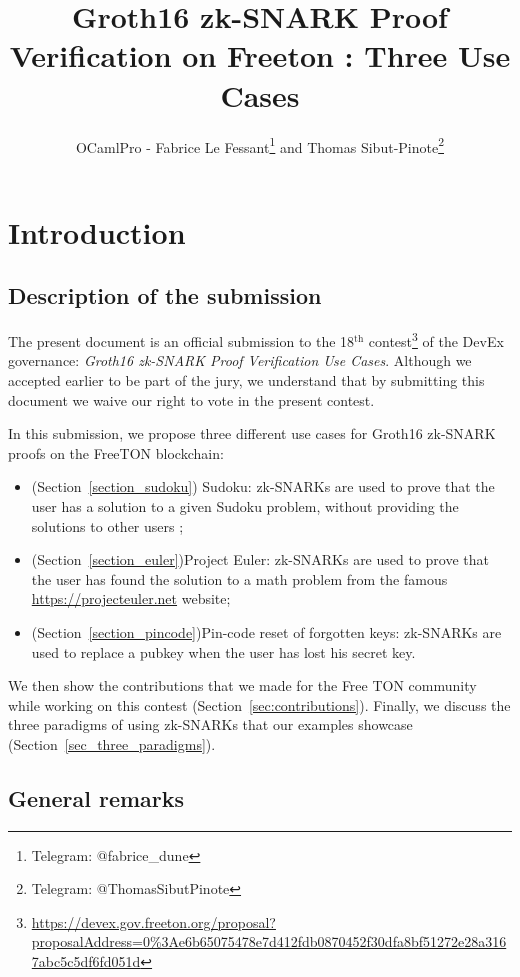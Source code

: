 \documentclass[10pt,a4paper]{article}
\author{OCamlPro - Fabrice Le Fessant\footnote{Telegram: @fabrice\_dune} and Thomas Sibut-Pinote\footnote{Telegram: @ThomasSibutPinote}}
\title{Groth16 zk-SNARK Proof Verification on Freeton : Three Use Cases}
\begin{document}
\maketitle

\newcommand{\zksnark}{zk-SNARK}
\newcommand{\zksnarks}{zk-SNARKs}


\section{Introduction}
\label{sec:intro}

\subsection{Description of the submission}
\label{subsec:description}

The present document is an official submission to the 18$^{\text{th}}$
contest\footnote{\url{https://devex.gov.freeton.org/proposal?proposalAddress=0\%3Ae6b65075478e7d412fdb0870452f30dfa8bf51272e28a3167abc5c5df6fd051d}}
of the DevEx governance: {\em Groth16 \zksnark{} Proof Verification Use
  Cases}. Although we accepted earlier to be part of the jury, we
understand that by submitting this document we waive our right to vote
in the present contest.

In this submission, we propose three different use cases for Groth16
\zksnark{} proofs on the FreeTON blockchain:
\begin{itemize}
\item (Section~\ref{section_sudoku}) Sudoku: \zksnarks{} are used to prove that the user has a solution
  to a given Sudoku problem, without providing the solutions to other
  users ;
\item (Section~\ref{section_euler})Project Euler: \zksnarks{} are used to prove that the user has found the solution to a math problem from the famous \url{https://projecteuler.net} website;
\item (Section~\ref{section_pincode})Pin-code reset of forgotten keys: \zksnarks{} are used to replace a
  pubkey when the user has lost his secret key.
\end{itemize}

We then show the contributions that we made for the Free TON community while working on
this contest (Section~\ref{sec:contributions}). Finally, we discuss the three paradigms of using \zksnarks{} that our examples showcase (Section~\ref{sec_three_paradigms}).

\subsection{General remarks}
\label{subsec:general_remarks}
\end{document}
